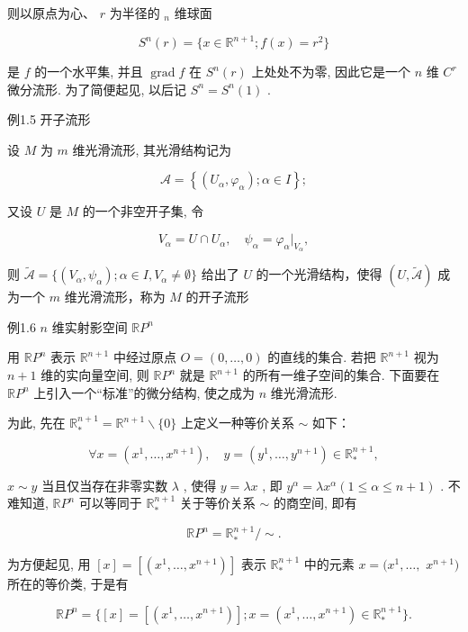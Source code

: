 则以原点为心、  $r$  为半径的  $_n$  维球面

$$
S ^ {n} (r) = \{x \in \mathbb {R} ^ {n + 1}; f (x) = r ^ {2} \}
$$

是  $f$  的一个水平集, 并且  $\operatorname{grad} f$  在  $S^n(r)$  上处处不为零, 因此它是一个  $n$  维  $C^r$  微分流形. 为了简便起见, 以后记  $S^n = S^n(1)$ .

例1.5 开子流形

设  $M$  为  $m$  维光滑流形, 其光滑结构记为

$$
\mathcal {A} = \left\{\left(U _ {\alpha}, \varphi_ {\alpha}\right); \alpha \in I \right\};
$$

又设  $U$  是  $M$  的一个非空开子集, 令

$$
V _ {\alpha} = U \cap U _ {\alpha}, \quad \psi_ {\alpha} = \varphi_ {\alpha} | _ {V _ {\alpha}},
$$

则  $\tilde{\mathcal{A}} = \{(V_{\alpha},\psi_{\alpha});\alpha \in I,V_{\alpha}\neq \emptyset \}$  给出了  $U$  的一个光滑结构，使得 $(U,\tilde{\mathcal{A}})$  成为一个  $m$  维光滑流形，称为  $M$  的开子流形

例1.6  $n$  维实射影空间  $\mathbb{R}P^n$

用  $\mathbb{R}P^n$  表示  $\mathbb{R}^{n + 1}$  中经过原点  $O = (0,\dots ,0)$  的直线的集合. 若把  $\mathbb{R}^{n + 1}$  视为  $n + 1$  维的实向量空间, 则  $\mathbb{R}P^n$  就是  $\mathbb{R}^{n + 1}$  的所有一维子空间的集合. 下面要在  $\mathbb{R}P^n$  上引入一个“标准”的微分结构, 使之成为  $n$  维光滑流形.

为此, 先在  $\mathbb{R}_{*}^{n + 1} = \mathbb{R}^{n + 1}\backslash \{0\}$  上定义一种等价关系  $\sim$  如下：

$$
\forall x = \left(x ^ {1}, \dots , x ^ {n + 1}\right), \quad y = \left(y ^ {1}, \dots , y ^ {n + 1}\right) \in \mathbb {R} _ {*} ^ {n + 1},
$$

$x \sim y$  当且仅当存在非零实数  $\lambda$ , 使得  $y = \lambda x$ , 即  $y^{\alpha} = \lambda x^{\alpha} (1 \leqslant \alpha \leqslant n + 1)$ . 不难知道,  $\mathbb{R}P^{n}$  可以等同于  $\mathbb{R}_{*}^{n + 1}$  关于等价关系  $\sim$  的商空间, 即有

$$
\mathbb {R} P ^ {n} = \mathbb {R} _ {*} ^ {n + 1} / \sim .
$$

为方便起见, 用  $[x] = [(x^{1},\dots ,x^{n + 1})]$  表示  $\mathbb{R}_*^{n + 1}$  中的元素  $x = (x^{1},\dots ,$ $x^{n + 1})$  所在的等价类, 于是有

$$
\mathbb {R} P ^ {n} = \{[ x ] = [ (x ^ {1}, \dots , x ^ {n + 1}) ]; x = (x ^ {1}, \dots , x ^ {n + 1}) \in \mathbb {R} _ {*} ^ {n + 1} \}.
$$

